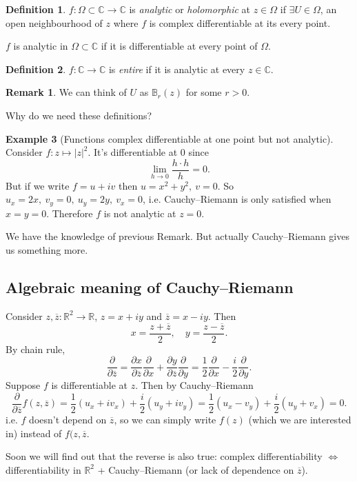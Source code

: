 \documentclass[a4paper]{article}
\theoremstyle{definition}
\newtheorem{defn}{Definition}[subsection]
\newtheorem{example}[defn]{Example}
\newtheorem*{remark}{Remark}
\begin{document}
\begin{defn}
$f:\Omega \subset \mathbb C \rightarrow \mathbb C$ is \textit{analytic} or \textit{holomorphic} at $z\in \Omega$ if $\exists U \in \Omega$, an open neighbourhood of $z$ where $f$ is complex differentiable at its every point.

$f$ is analytic in $\Omega \subset \mathbb C$ if it is differentiable at every point of $\Omega$.
\end{defn}
\begin{defn}
$f:\mathbb C \rightarrow \mathbb C$ is \textit{entire} if it is analytic at every $z\in \mathbb C$.
\end{defn}
\begin{remark}
We can think of $U$ as $\mathbb B_r(z)$ for some $r>0$.
\end{remark}
Why do we need these definitions?
\begin{example}[Functions complex differentiable at one point but not analytic]
Consider $f:z\mapsto |z|^2$. It's differentiable at 0 since
\[
\lim_{h\rightarrow 0} \frac{h\cdot h}{h} = 0.
\]
But if we write $f=u+iv$ then $u=x^2+y^2,\ v=0$. So $u_x=2x,\ v_y=0,\ u_y=2y,\ v_x=0$, i.e. Cauchy–Riemann is only satisfied when $x=y=0$. Therefore $f$ is not analytic at $z=0$.
\end{example}
We have the knowledge of previous Remark. But actually Cauchy–Riemann gives us something more.
\subsection{Algebraic meaning of Cauchy–Riemann}
Consider $z,\overline{z}:\mathbb R^2 \rightarrow \mathbb R$, $z=x+iy$ and $\overline{z}=x-iy$. Then
\[
x=\frac{z+\overline{z}}{2},\quad y=\frac{z-\overline{z}}{2}.
\]
By chain rule,
\[
\frac{\partial}{\partial \overline{z}} = \frac{\partial x}{\partial\overline{z}} \frac{\partial}{\partial x} + \frac{\partial y}{\partial \overline{z}} \frac{\partial}{\partial y} = \frac12 \frac{\partial}{\partial x} - \frac{i}2 \frac{\partial}{\partial y}.
\]
Suppose $f$ is differentiable at $z$. Then by Cauchy–Riemann
\[
\frac{\partial}{\partial \overline{z}} f(z,\overline{z}) = \frac12 (u_x + iv_x) + \frac{i}2 (u_y + i v_y) = \frac12 (u_x-v_y) + \frac{i}2 (u_y+v_x)=0.
\]
i.e. $f$ doesn't depend on $\overline{z}$, so we can simply write $f(z)$ (which we are interested in) instead of $f(z,\overline{z}$.

Soon we will find out that the reverse is also true: complex differentiability $\Leftrightarrow$ differentiability in $\mathbb R^2$ + Cauchy–Riemann (or lack of dependence on $\overline{z}$).
\end{document}
